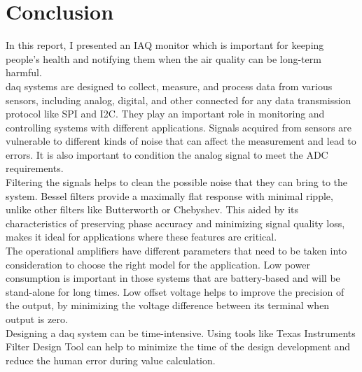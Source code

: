 \section{Conclusion}
\label{sec:conclusion}
\hspace{8pt}
In this report, I presented an IAQ monitor which is important for keeping people's health and notifying them when the air quality can be long-term harmful. \\

\acrshort{daq} systems are designed to collect, measure, and process data from various sensors, including analog, digital, and other connected for any data transmission protocol like SPI and I2C. They play an important role in monitoring and controlling systems with different applications. Signals acquired from sensors are vulnerable to different kinds of noise that can affect the measurement and lead to errors. It is also important to condition the analog signal to meet the ADC requirements. \\

Filtering the signals helps to clean the possible noise that they can bring to the system. Bessel filters provide a maximally flat response with minimal ripple, unlike other filters like Butterworth or Chebyshev. This aided by its characteristics of preserving phase accuracy and minimizing signal quality loss, makes it ideal for applications where these features are critical. \\

The operational amplifiers have different parameters that need to be taken into consideration to choose the right model for the application. Low power consumption is important in those systems that are battery-based and will be stand-alone for long times. Low offset voltage helps to improve the precision of the output, by minimizing the voltage difference between its terminal when output is zero. \\

Designing a \acrshort{daq} system can be time-intensive. Using tools like Texas Instruments Filter Design Tool can help to minimize the time of the design development and reduce the human error during value calculation.


